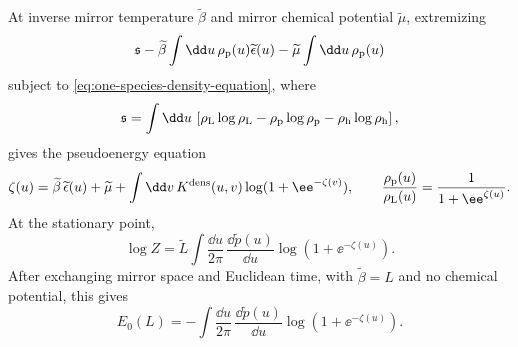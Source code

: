 \begin{proposition}
\begin{equation}
\end{equation}
At inverse mirror temperature \(\widetilde\beta\) and mirror chemical potential
\(\widetilde\mu\), extremizing
\[
  \mathfrak s
  -
  \widetilde\beta\int\dd u\,\rho_{\rm p}(u)\widetilde\epsilon(u)
  -
  \widetilde\mu\int\dd u\,\rho_{\rm p}(u)
\]
subject to \eqref{eq:one-species-density-equation}, where
\[
  \mathfrak s
  =
  \int\dd u\,
  \left[
    \rho_{\rm L}\log\rho_{\rm L}
    -
    \rho_{\rm p}\log\rho_{\rm p}
    -
    \rho_{\rm h}\log\rho_{\rm h}
  \right],
\]
gives the pseudoenergy equation
\begin{equation}
  \zeta(u)
  =
  \widetilde\beta\,\widetilde\epsilon(u)
  +
  \widetilde\mu
  +
  \int\dd v\,K^{\rm dens}(u,v)\log(1+\ee^{-\zeta(v)}),
  \qquad
  \frac{\rho_{\rm p}(u)}{\rho_{\rm L}(u)}
  =
  \frac{1}{1+\ee^{\zeta(u)}} .
  \label{eq:one-species-tba}
\end{equation}
At the stationary point,
\begin{equation}
  \log Z
  =
  \widetilde L
  \int\frac{\dd u}{2\pi}\,
  \frac{\dd \widetilde p(u)}{\dd u}
  \log(1+\ee^{-\zeta(u)}).
  \label{eq:one-species-log-z}
\end{equation}
After exchanging mirror space and Euclidean time, with
\(\widetilde\beta=L\) and no chemical potential, this gives
\begin{equation}
  E_0(L)
  =
  -
  \int\frac{\dd u}{2\pi}\,
  \frac{\dd \widetilde p(u)}{\dd u}
  \log(1+\ee^{-\zeta(u)}).
  \label{eq:one-species-ground-state-energy}
\end{equation}
\end{proposition}

